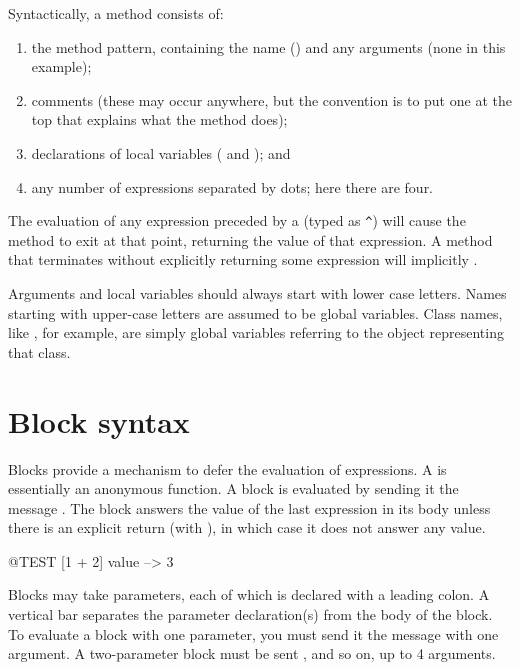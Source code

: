 \documentclass[a4paper,10pt,twoside]{book}
\begin{document}
Syntactically, a method consists of:
\begin{enumerate}
  \item the method pattern, containing the name (\ie {}) and any arguments (none in this example);
  \item comments (these may occur anywhere, but the convention is to put one at the top that explains what the method does);
  \item declarations of local variables (\ie {} and ); and
  \item any number of expressions separated by dots; here there are four.
\end{enumerate}

The evaluation of any expression preceded by a \ct{^} (typed as \verb|^|) will cause the method to exit at that point, returning the value of that expression.
A method that terminates without explicitly returning some expression will implicitly  .

Arguments and local variables should always start with lower case letters.
Names starting with upper-case letters are assumed to be global variables.
Class names, like , for example, are simply global variables referring to the object representing that class.

\section{Block syntax}

Blocks provide a mechanism to defer the evaluation of expressions.
A  is essentially an anonymous function.
A block is evaluated by sending it the message .
The block answers the value of the last expression in its body unless there is an explicit return (with \ct{^}), in which case it does not answer any value.

\begin{code}{@TEST}
[1 + 2] value --> 3
\end{code}

Blocks may take parameters, each of which is declared with a leading colon.
A  vertical bar separates the parameter declaration(s) from the body of the block.
To evaluate a block with one parameter, you must send it the message  with one argument.
A two-parameter block must be sent , and so on, up to 4 arguments.
\end{document}
